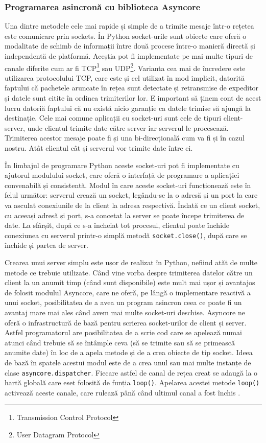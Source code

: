 \documentclass[../IoMusT.tex]{subfiles}
\begin{document}
\subsubsection{Programarea asincronă cu biblioteca Asyncore}
Una dintre metodele cele mai rapide și simple de a trimite mesaje într-o rețetea este comunicare prin sockets. În Python socket-urile sunt obiecte care oferă o modalitate de schimb de informații între două procese între-o manieră directă și independentă de platformă. Aceștia pot fi implementate pe mai multe tipuri de canale diferite cum ar fi TCP\footnote{Transmission Control Protocol} sau UDP\footnote{User Datagram Protocol}. Varianta cea mai de încredere este utilizarea protocolului TCP, care este și cel utilizat în mod implicit, datorită faptului că pachetele aruncate în rețea sunt detectate și retransmise de expeditor și datele sunt citite în ordinea trimiterilor lor. E important să ținem cont de acest lucru datoriă faptului că nu există nicio garanție ca datele trimise să ajungă la destinație. Cele mai comune aplicații cu socket-uri sunt cele de tipuri client-server, unde clientul trimite date către server iar serverul le procesează. Trimiterea acestor mesaje poate fi și una bi-direcțională cum va fi și în cazul nostru. Atât clientul cât și serverul vor trimite date între ei.
\\
\par În limbajul de programare Python aceste socket-uri pot fi implementate cu ajutorul modulului socket, care oferă o interfață de programare a aplicației convenabilă și consistentă. Modul în care aceste socket-uri funcționează este în felul următor: serverul crează un socket, legându-se la o adresă și un port la care va asculat conexiunile de la client la adresa respectivă. Îndată ce un client socket, cu aceeași adresă și port, s-a concetat la server se poate începe trimiterea de date. La sfârșit, după ce s-a încheiat tot procesul, clientul poate închide conexiunea cu serverul printr-o simplă metodă \verb|socket.close()|, după care se închide și partea de server.
\\
\par Crearea unui server simplu este ușor de realizat în Python, nefiind atăt de multe metode ce trebuie utilizate. Când vine vorba despre trimiterea datelor către un client la un anumit timp (când sunt disponibile) este mult mai ușor și avantajos de folosit modulul Asyncore, care ne oferă, pe lângă o implementare reactivă a unui socket, posibilitatea de a avea un program asincron ceea ce poate fi un avantaj mare mai ales când avem mai multe socket-uri deschise. Asyncore ne oferă o infrastructură de bază pentru scrierea socket-urilor de client și server. Astfel programatorul are posibilitatea de a scrie cod care se apelează numai atunci când trebuie să se întâmple ceva (să se trimite sau să se primească anumite date) în loc de a apela metode și de a crea obiecte de tip socket. Ideea de bază în spatele acestui modul este de a crea unul sau mai multe instanțe de clase \verb|asyncore.dispatcher|. Fiecare astfel de canal de rețea creat se adaugă la o hartă globală care eset folosită de funția \verb|loop()|. Apelarea acestei metode \verb|loop()| activează aceste canale, care rulează până când ultimul canal a fost închis \cite{Async}.
\end{document}
